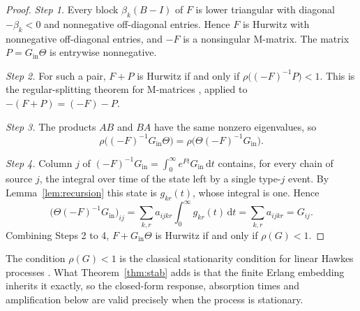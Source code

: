 \begin{proof}
\emph{Step 1.} Every block $\beta_k(B-I)$ of $F$ is lower triangular with diagonal $-\beta_k<0$
and nonnegative off-diagonal entries. Hence $F$ is Hurwitz with nonnegative off-diagonal entries,
and $-F$ is a nonsingular M-matrix. The matrix $P=G_{\mathrm{in}}\Theta$ is entrywise nonnegative.

\emph{Step 2.} For such a pair, $F+P$ is Hurwitz if and only if $\rho\bigl((-F)^{-1}P\bigr)<1$. This
is the regular-splitting theorem for M-matrices \citep[Ch.~3]{varga2000matrix}, applied to
$-(F+P)=(-F)-P$.

\emph{Step 3.} The products $AB$ and $BA$ have the same nonzero eigenvalues, so
\[
\rho\bigl((-F)^{-1}G_{\mathrm{in}}\Theta\bigr)=\rho\bigl(\Theta(-F)^{-1}G_{\mathrm{in}}\bigr).
\]

\emph{Step 4.} Column $j$ of $(-F)^{-1}G_{\mathrm{in}}=\int_0^\infty e^{Ft}G_{\mathrm{in}}\,\mathrm{d}t$
contains, for every chain of source $j$, the integral over time of the state left by a single
type-$j$ event. By Lemma~\ref{lem:recursion} this state is $g_{kr}(t)$, whose integral is one.
Hence
\[
\bigl(\Theta(-F)^{-1}G_{\mathrm{in}}\bigr)_{ij}=\sum_{k,r}a_{ijkr}\int_0^\infty g_{kr}(t)\,\mathrm{d}t
=\sum_{k,r}a_{ijkr}=G_{ij}.
\]
Combining Steps 2 to 4, $F+G_{\mathrm{in}}\Theta$ is Hurwitz if and only if $\rho(G)<1$.
\end{proof}

The condition $\rho(G)<1$ is the classical stationarity condition for linear Hawkes processes
\citep{hawkes1971spectra,bremaud1996stability}. What Theorem~\ref{thm:stab} adds is that the finite
Erlang embedding inherits it exactly, so the closed-form response, absorption times and
amplification below are valid precisely when the process is stationary.

